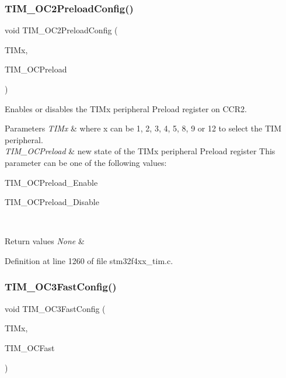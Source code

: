 \subsubsection{\texorpdfstring{T\+I\+M\+\_\+\+O\+C2\+Preload\+Config()}{TIM\_OC2PreloadConfig()}}
{\footnotesize\ttfamily void T\+I\+M\+\_\+\+O\+C2\+Preload\+Config (\begin{DoxyParamCaption}\item[{\hyperlink{struct_t_i_m___type_def}{T\+I\+M\+\_\+\+Type\+Def} $\ast$}]{T\+I\+Mx,  }\item[{uint16\+\_\+t}]{T\+I\+M\+\_\+\+O\+C\+Preload }\end{DoxyParamCaption})}



Enables or disables the T\+I\+Mx peripheral Preload register on C\+C\+R2. 


\begin{DoxyParams}{Parameters}
{\em T\+I\+Mx} & where x can be 1, 2, 3, 4, 5, 8, 9 or 12 to select the T\+IM peripheral. \\
\hline
{\em T\+I\+M\+\_\+\+O\+C\+Preload} & new state of the T\+I\+Mx peripheral Preload register This parameter can be one of the following values\+: \begin{DoxyItemize}
\item T\+I\+M\+\_\+\+O\+C\+Preload\+\_\+\+Enable \item T\+I\+M\+\_\+\+O\+C\+Preload\+\_\+\+Disable \end{DoxyItemize}
\\
\hline
\end{DoxyParams}

\begin{DoxyRetVals}{Return values}
{\em None} & \\
\hline
\end{DoxyRetVals}


Definition at line 1260 of file stm32f4xx\+\_\+tim.\+c.

\mbox{\label{group___t_i_m___group2_gab2f3698e6e56bd9b0a4be7056ba789e1}} 
\subsubsection{\texorpdfstring{T\+I\+M\+\_\+\+O\+C3\+Fast\+Config()}{TIM\_OC3FastConfig()}}
{\footnotesize\ttfamily void T\+I\+M\+\_\+\+O\+C3\+Fast\+Config (\begin{DoxyParamCaption}\item[{\hyperlink{struct_t_i_m___type_def}{T\+I\+M\+\_\+\+Type\+Def} $\ast$}]{T\+I\+Mx,  }\item[{uint16\+\_\+t}]{T\+I\+M\+\_\+\+O\+C\+Fast }\end{DoxyParamCaption})}



